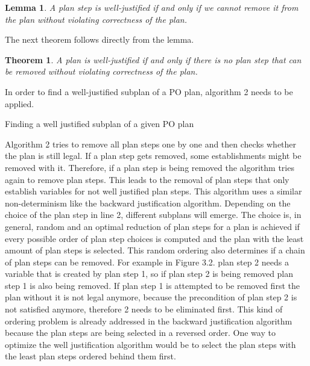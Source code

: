 \newtheorem{Lemma}{Lemma}
\begin{Lemma}
    \cite{Justification} \textit{A plan step is well-justified if and only if we
    cannot remove it from the plan without violating correctness of the plan.}
\end{Lemma}
  The next theorem follows directly from the lemma.
\newtheorem{theorem}{Theorem}
\begin{theorem}
    \cite{Justification} \textit{A plan is well-justified if and only if there
    is no plan step that can be removed without violating correctness of the plan.}
\end{theorem}
In order to find a well-justified subplan of a PO plan, algorithm 2 needs to be applied.
\newline
\vspace{1em}
\newline
\begin{algorithm}[H]
    \SetAlgoLined
    \vspace{2em}
    \caption{Finding a well justified subplan of a given PO plan}
\end{algorithm}

Algorithm 2 tries to remove all plan steps one by one and then checks whether the plan is still legal.
If a plan step gets removed, some establishments might be removed with it. 
Therefore, if a plan step is being removed the algorithm tries again to remove plan steps.
This leads to the removal of plan steps that only establish variables for not well justified plan steps.
This algorithm uses a similar non-determinism like the backward justification algorithm. Depending on the
choice of the plan step in line 2, different subplans will emerge. The choice is, in general, random and an optimal reduction of 
plan steps for a plan is achieved if every possible order of plan step choices is computed and the plan with the least amount 
of plan steps is selected. This random ordering also determines if a chain of plan steps can be removed. For example in Figure 3.2. plan step 2
needs a variable that is created by plan step 1, so if plan step 2 is being removed plan step 1 is also being removed.
If plan step 1 is attempted to be removed first the plan without it is not legal anymore,
because the precondition of plan step 2 is not satisfied anymore, therefore 2 needs to be eliminated first. This kind of ordering problem is already addressed in the
backward justification algorithm because the plan steps are being selected in a reversed order. One way to optimize the well justification algorithm would be 
to select the plan steps with the least plan steps ordered behind them first.


